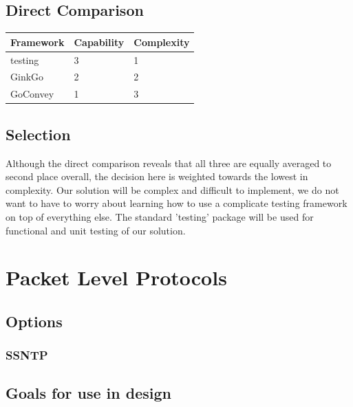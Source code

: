 \documentclass[10pt,letterpaper,onecolumn,draftclsnofoot]{IEEEtran}
\begin{document}
\subsection{Direct Comparison}

\begin{center}
	\begin{tabular}{| l | l | l |}
		\hline
		Framework & Capability & Complexity
		\\ \hline
		testing  & 3 & 1  \\ \hline
		GinkGo   & 2 & 2  \\ \hline
		GoConvey & 1 & 3  \\ \hline
	\end{tabular}
\end{center}

\subsection{Selection}
Although the direct comparison reveals that all three are equally averaged to
second place overall, the decision here is weighted towards the lowest in
complexity. Our solution will be complex and difficult to implement, we do not
want to have to worry about learning how to use a complicate testing framework
on top of everything else. The standard 'testing' package will be used for
functional and unit testing of our solution.

\section{Packet Level Protocols}

\subsection{Options}

\subsubsection{SSNTP}

\subsubsection{}

\subsubsection{}

\subsection{Goals for use in design}
\end{document}
